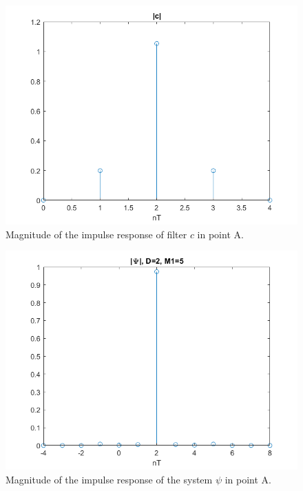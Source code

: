 \documentclass[a4paper,11.5pt]{article}
\begin{document}
\begin{figure}[ht]
	\begin{center}   
		\includegraphics[width=\textwidth]{figs/A_c.png} 
		\caption{Magnitude of the impulse response of filter $c$ in point A.}
		\label{fig:A_c}
	\end{center}
\end{figure}

\begin{figure}[ht]
	\begin{center}   
		\includegraphics[width=\textwidth]{figs/A_psi.png} 
		\caption{Magnitude of the impulse response of the system $\psi$ in point A.}
		\label{fig:A_psi}
	\end{center}
\end{figure}
\end{document}
